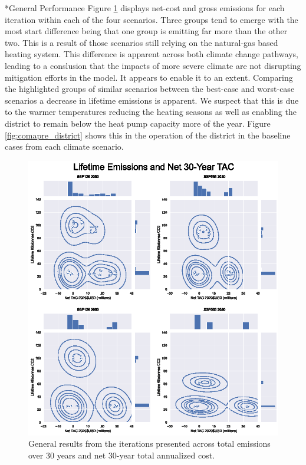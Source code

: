\documentclass[twocolumn, a4paper,10pt]{article}
\makeatletter
\renewcommand\subsection{\@startsection{subsection}{1}{\z@}{\z@}{\z@}{\normalfont\normalsize\bfseries}}
\renewcommand\subsection{\@startsection{subsection}{1}{\z@}{\z@}{0.1pt}{\normalfont\normalsize\bfseries}}
\makeatother
\begin{document}
\subsection*{General Performance}
Figure \ref{fig:cross_plot} displays net-cost and gross emissions for each iteration within each of the four scenarios. Three groups tend to emerge with the most start difference being that one group is emitting far more than the other two. This is a result of those scenarios still relying on the natural-gas based heating system. This difference is apparent across both climate change pathways, leading to a conslusion that the impacts of more severe climate are not disrupting mitigation efforts in the model. It appears to enable it to an extent. Comparing the highlighted groups of similar scenarios between the best-case and worst-case scenarios a decrease in lifetime emissions is apparent. We suspect that this is due to the warmer temperatures reducing the heating seasons as well as enabling the district to remain below the heat pump capacity more of the year. Figure \ref{fig:comapre_district} shows this in the operation of the district in the baseline cases from each climate scenario.

\begin{figure}[hbt]
    \centering
    \includegraphics[scale=0.8]{figures/general_results_box.eps}
    \caption{General results from the iterations presented across total emissions over 30 years and net 30-year total annualized cost.}
    \label{fig:cross_plot}
\end{figure}
\end{document}
